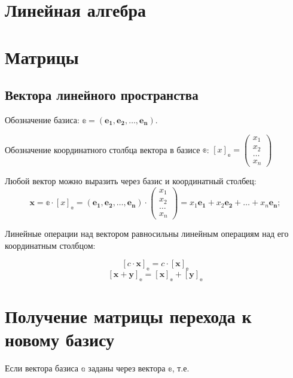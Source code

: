 
\section{Линейная алгебра}

\section{Матрицы}

\subsection{Вектора линейного пространства}

Обозначение базиса: $\mathbb{e} = (\boldsymbol{e_1}, \boldsymbol{e_2}, \dots, \boldsymbol{e_n})$.

Обозначение координатного столбца вектора в базисе $\mathbb{e}$: $[x]_\mathbb{e} = 
\begin{pmatrix}
	x_1\\
	x_2\\
	\dots\\
	x_n
\end{pmatrix} $  

Любой вектор можно выразить через базис и координатный столбец: 
$$
	\boldsymbol{x} = \mathbb{e}\cdot [x]_\mathbb{e} = (\boldsymbol{e_1}, \boldsymbol{e_2}, \dots, \boldsymbol{e_n}) \cdot 
	\begin{pmatrix}
		x_1\\
		x_2\\
		\dots\\
		x_n
	\end{pmatrix} = x_1\boldsymbol{e_1} + x_2\boldsymbol{e_2} + \dots + x_n\boldsymbol{e_n}; 
$$

Линейные операции над вектором равносильны линейным операциям над его координатным столбцом:

$$ [c\cdot \boldsymbol{x}]_\mathbb{e} = c\cdot [\boldsymbol{x}]_\mathbb{e} $$
$$ [\boldsymbol{x} + \boldsymbol{y}]_\mathbb{e} = [\boldsymbol{x}]_\mathbb{e} + [\boldsymbol{y}]_\mathbb{e} $$

\section{Получение матрицы перехода к новому базису}

Если вектора базиса $\mathbb{a}$ заданы через вектора $\mathbb{e}$, т.е.


